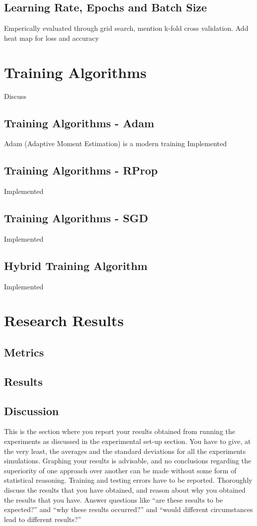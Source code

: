 \documentclass[conference]{IEEEtran}
\begin{document}
\subsection{Learning Rate, Epochs and Batch Size}
Emperically evaluated through grid search, mention k-fold cross validation. Add heat map for loss and accuracy


\section{Training Algorithms}
Discuss
\subsection{Training Algorithms - Adam}
Adam (Adaptive Moment Estimation) is a modern training
Implemented
\subsection{Training Algorithms - RProp}
Implemented
\subsection{Training Algorithms - SGD}
Implemented
\subsection{Hybrid Training Algorithm}
Implemented

\section{Research Results}
\subsection{Metrics}
\subsection{Results}
\subsection{Discussion}
This is the section where you report your results obtained from running the experiments as discussed in the experimental set-up section. You have to give, at the very least, the averages and the standard deviations for all the experiments simulations. Graphing your results is advisable, and no conclusions regarding the superiority of one approach over another can be made without some form of statistical reasoning. Training and testing errors have to be reported. Thoroughly discuss the results that you have obtained, and reason about why you obtained the results that you have. Answer questions like “are these results to be expected?” and “why these results occurred?” and “would different circumstances lead to different results?”
\end{document}
